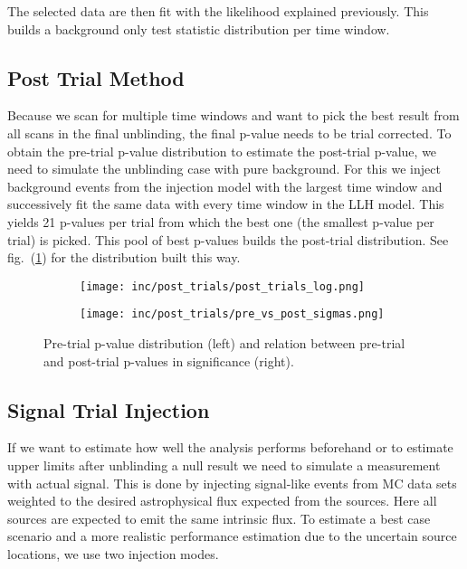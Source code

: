 The selected data are then fit with the likelihood explained previously.
This builds a background only test statistic distribution per time window.

\subsection{Post Trial Method}
Because we scan for multiple time windows and want to pick the best result from all scans in the final unblinding, the final p-value needs to be trial corrected.
To obtain the pre-trial p-value distribution to estimate the post-trial p-value, we need to simulate the unblinding case with pure background.
For this we inject background events from the injection model with the largest time window and successively fit the same data with every time window in the LLH model.
This yields 21 p-values per trial from which the best one (the smallest p-value per trial) is picked.
This pool of best p-values builds the post-trial distribution.
See fig.~(\ref{fig:post_trials}) for the distribution built this way.

\begin{figure}[htbp]
  \centering
  \begin{subfigure}[c]{0.49\textwidth}
    \texttt{[image: inc/post\_trials/post\_trials\_log.png]}
  \end{subfigure}
  \hfill
  \begin{subfigure}[c]{0.49\textwidth}
    \texttt{[image: inc/post\_trials/pre\_vs\_post\_sigmas.png]}
  \end{subfigure}
  \caption{Pre-trial p-value distribution (left) and relation between pre-trial and post-trial p-values in significance (right).}
  \label{fig:post_trials}
\end{figure}

\subsection{Signal Trial Injection}
If we want to estimate how well the analysis performs beforehand or to estimate upper limits after unblinding a null result we need to simulate a measurement with actual signal.
This is done by injecting signal-like events from MC data sets weighted to the desired astrophysical flux expected from the sources.
Here all sources are expected to emit the same intrinsic flux.
To estimate a best case scenario and a more realistic performance estimation due to the uncertain source locations, we use two injection modes.

